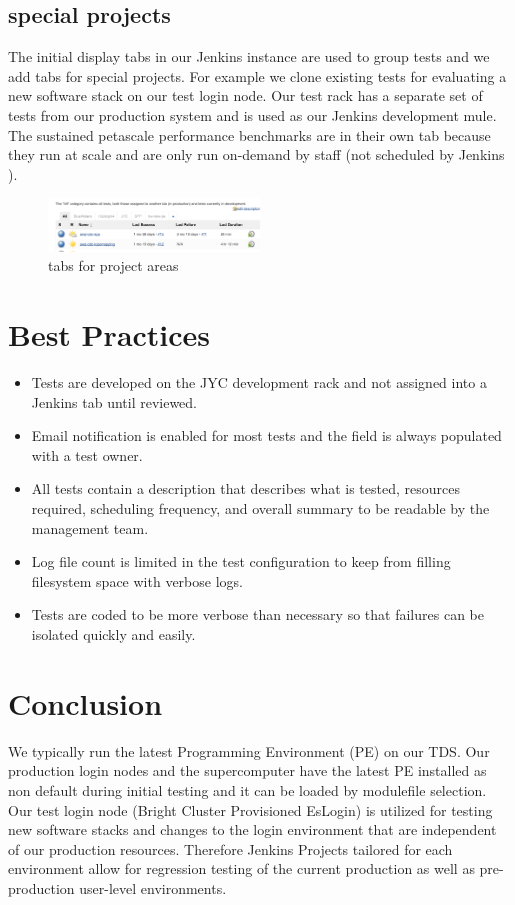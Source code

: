 \documentclass[10pt, conference, compsocconf]{IEEEtran}
\begin{document}
{\subsection{special projects}
The initial display tabs in our Jenkins instance are used to group tests and we add tabs for special projects.   For example we clone existing tests for evaluating a new software stack on our test login node.   Our test rack has a separate set of tests from our production system and is used as our Jenkins development mule.  The sustained petascale performance benchmarks are in their own tab because they run at scale and are only run on-demand by staff (not scheduled by Jenkins ).
\begin{figure}[H]
\centering
\includegraphics[width=0.5\textwidth]{tabs-display}
\caption{ tabs for project areas }
\label{fig:tabs-display}
\end{figure}

\section{Best Practices}
\begin{itemize}
\item Tests are developed on the JYC development rack and not assigned into a Jenkins tab until reviewed. 
\item Email notification is enabled for most tests and the field is always populated with a test owner.
\item All tests contain a description that describes what is tested, resources required, scheduling frequency, and overall summary  to be readable by the management team.
\item Log file count is limited in the test configuration to keep from filling filesystem space with verbose logs.
\item Tests are coded to be more verbose than necessary so that failures can be isolated quickly and easily.
\end{itemize}

\section{Conclusion}
\label{sec:conclusion}

We typically run the latest Programming Environment (PE) on our TDS. Our production login nodes and the supercomputer have the latest PE installed as non default during initial testing and it can be loaded by modulefile selection. Our test login node (Bright Cluster Provisioned EsLogin) is utilized for testing new software stacks and changes to the login environment that are independent of our production resources. Therefore Jenkins Projects tailored for each environment allow for regression testing of the current production as well as pre-production user-level environments.   

}
\end{document}
